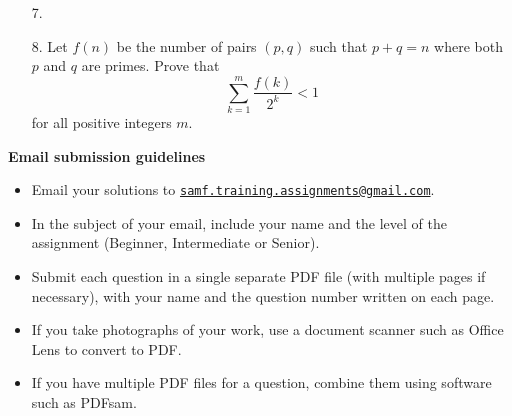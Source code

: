 \documentclass{article}
\begin{document}
\begin{enumerate}
\medskip
\item[7.] %


\medskip
\item[8.] %
Let $f(n)$ be the number of pairs $(p, q)$ such that $p + q = n$ where both $p$ and $q$ are primes. Prove that
$$\sum_{k = 1}^{m} \frac{f(k)}{2^k} < 1$$
for all positive integers $m$.


\end{enumerate}


\vfill
\textbf{\Large Email submission guidelines}
\begin{itemize}
	\item Email your solutions to \href{mailto:samf.training.assignments@gmail.com}{\texttt{samf.training.assignments@gmail.com}}.
	\item In the subject of your email, include your name and the level of the assignment (Beginner, Intermediate or Senior).
	\item Submit each question in a single separate PDF file (with multiple pages if necessary), with your name and the question number written on each page.
	\item If you take photographs of your work, use a document scanner such as Office Lens to convert to PDF.
	\item If you have multiple PDF files for a question, combine them using software such as PDFsam.
\end{itemize}
\end{document}
